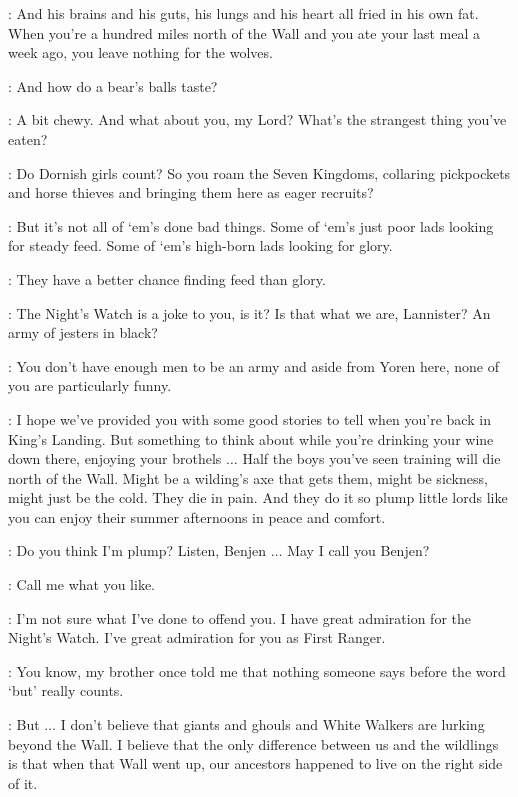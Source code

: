 \YOREN: And his brains and his guts, his lungs and his heart all fried in his own fat. When you're a hundred miles north of the Wall and you ate your last meal a week ago, you leave nothing for the wolves. 

\TYRION: And how do a bear's balls taste? 

\YOREN: A bit chewy. And what about you, my Lord? What's the strangest thing you've eaten? 

\TYRION: Do Dornish girls count? So you roam the Seven Kingdoms, collaring pickpockets and horse thieves and bringing them here as eager recruits? 

\YOREN: But it's not all of `em's done bad things. Some of `em's just poor lads looking for steady feed. Some of `em's high-born lads looking for glory. 

\TYRION: They have a better chance finding feed than glory. 


\BENJEN: The Night's Watch is a joke to you, is it? Is that what we are, Lannister? An army of jesters in black? 

\TYRION: You don't have enough men to be an army and aside from Yoren here, none of you are particularly funny. 

\BENJEN: I hope we've provided you with some good stories to tell when you're back in King's Landing. But something to think about while you're drinking your wine down there, enjoying your brothels $\ldots$ Half the boys you've seen training will die north of the Wall. Might be a wilding's axe that gets them, might be sickness, might just be the cold. They die in pain. And they do it so plump little lords like you can enjoy their summer afternoons in peace and comfort. 

\TYRION:  Do you think I'm plump? Listen, Benjen $\ldots$ May I call you Benjen? 

\BENJEN: Call me what you like. 

\TYRION: I'm not sure what I've done to offend you. I have great admiration for the Night's Watch. I've great admiration for you as First Ranger. 

\BENJEN: You know, my brother once told me that nothing someone says before the word `but' really counts. 

\TYRION: But $\ldots$ I don't believe that giants and ghouls and White Walkers are lurking beyond the Wall. I believe that the only difference between us and the wildlings is that when that Wall went up, our ancestors happened to live on the right side of it. 

